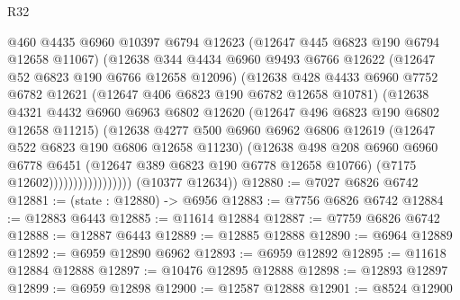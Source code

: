 \begin{lexlean}{R32}
\begin{coremodule}
                            @460
                            @4435
                            @6960
                            @10397
                            @6794
                            @12623
                            (@12647 @445 @6823 @190 @6794 @12658 @11067)
                            (@12638
                              @344
                              @4434
                              @6960
                              @9493
                              @6766
                              @12622
                              (@12647 @52 @6823 @190 @6766 @12658 @12096)
                              (@12638
                                @428
                                @4433
                                @6960
                                @7752
                                @6782
                                @12621
                                (@12647 @406 @6823 @190 @6782 @12658 @10781)
                                (@12638
                                  @4321
                                  @4432
                                  @6960
                                  @6963
                                  @6802
                                  @12620
                                  (@12647 @496 @6823 @190 @6802 @12658 @11215)
                                  (@12638
                                    @4277
                                    @500
                                    @6960
                                    @6962
                                    @6806
                                    @12619
                                    (@12647 @522 @6823 @190 @6806 @12658 @11230)
                                    (@12638
                                      @498
                                      @208
                                      @6960
                                      @6960
                                      @6778
                                      @6451
                                      (@12647 @389 @6823 @190 @6778 @12658 @10766)
                                      (@7175 @12602)))))))))))))))))
      (@10377 @12634))
@12880 := @7027 @6826 @6742
@12881 := (state : @12880) -> @6956
@12883 := @7756 @6826 @6742
@12884 := @12883 @6443
@12885 := @11614 @12884
@12887 := @7759 @6826 @6742
@12888 := @12887 @6443
@12889 := @12885 @12888
@12890 := @6964 @12889
@12892 := @6959 @12890 @6962
@12893 := @6959 @12892
@12895 := @11618 @12884 @12888
@12897 := @10476 @12895 @12888
@12898 := @12893 @12897
@12899 := @6959 @12898
@12900 := @12587 @12888
@12901 := @8524 @12900

\end{coremodule}
\end{lexlean}
